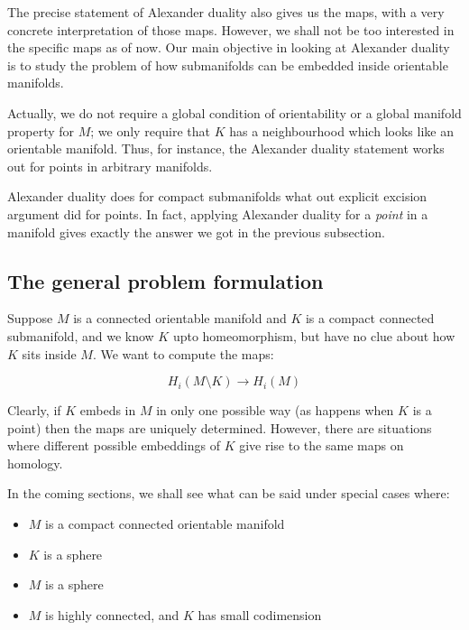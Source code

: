 \documentclass[a4paper]{amsart}
\begin{document}
The precise statement of Alexander duality also gives us the maps,
with a very concrete interpretation of those maps. However, we shall
not be too interested in the specific maps as of now. Our main
objective in looking at Alexander duality is to study the problem of
how submanifolds can be embedded inside orientable manifolds.

Actually, we do not require a global condition of orientability or a
global manifold property for $M$; we only require that $K$ has a
neighbourhood which looks like an orientable manifold. Thus, for
instance, the Alexander duality statement works out for points in
arbitrary manifolds.

Alexander duality does for compact submanifolds what out explicit
excision argument did for points. In fact, applying Alexander duality
for a {\em point} in a manifold gives exactly the answer we got in the
previous subsection.

\subsection{The general problem formulation}

Suppose $M$ is a connected orientable manifold and $K$ is a compact connected
submanifold, and we know $K$ upto homeomorphism, but have no clue
about how $K$ sits inside $M$. We want to compute the maps:

$$H_i(M \setminus K) \to H_i(M)$$

Clearly, if $K$ embeds in $M$ in only one possible way (as happens
when $K$ is a point) then the maps are uniquely determined. However,
there are situations where different possible embeddings of $K$ give
rise to the same maps on homology.

In the coming sections, we shall see what can be said under special
cases where:

\begin{itemize}

\item $M$ is a compact connected orientable manifold

\item $K$ is a sphere

\item $M$ is a sphere

\item $M$ is highly connected, and $K$ has small codimension

\end{itemize}
\end{document}
